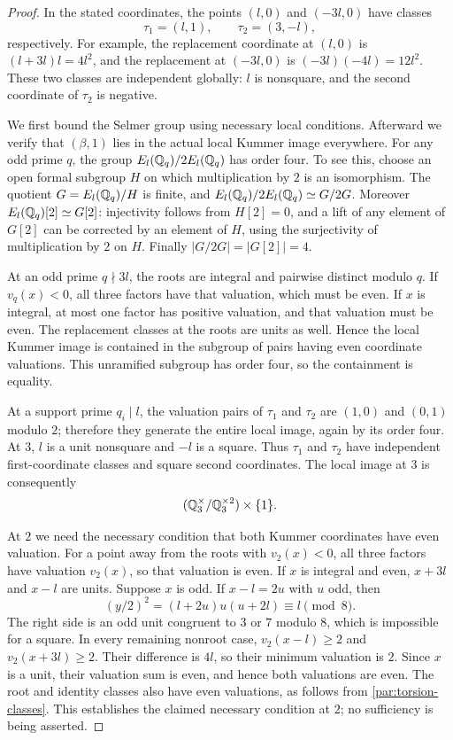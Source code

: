 \begin{proof}
In the stated coordinates, the points $(l,0)$ and $(-3l,0)$ have
classes
\begin{equation}\label{par:torsion-classes}
 \tau_1=(l,1),\qquad \tau_2=(3,-l),
\end{equation}
respectively. For example, the replacement coordinate at $(l,0)$
is $(l+3l)l=4l^2$, and the replacement at $(-3l,0)$ is
$(-3l)(-4l)=12l^2$. These two classes are independent globally:
$l$ is nonsquare, and the second coordinate of $\tau_2$ is negative.

We first bound the Selmer group using necessary local conditions.
Afterward we verify that $(\beta,1)$ lies in the actual local Kummer
image everywhere. For any odd prime $q$, the group
$E_l(\mathbb Q_q)/2E_l(\mathbb Q_q)$ has order four. To see this, choose an
open formal subgroup $H$ on which multiplication by $2$ is an
isomorphism. The quotient $G=E_l(\mathbb Q_q)/H$ is finite, and
$E_l(\mathbb Q_q)/2E_l(\mathbb Q_q)\simeq G/2G$. Moreover
$E_l(\mathbb Q_q)[2]\simeq G[2]$: injectivity follows from $H[2]=0$,
and a lift of any element of $G[2]$ can be corrected by an element
of $H$, using the surjectivity of multiplication by $2$ on $H$.
Finally $|G/2G|=|G[2]|=4$.

At an odd prime $q\nmid3l$, the roots are integral and pairwise
distinct modulo $q$. If $v_q(x)<0$, all three factors have that
valuation, which must be even. If $x$ is integral, at most one
factor has positive valuation, and that valuation must be even.
The replacement classes at the roots are units as well. Hence
the local Kummer image is contained in the subgroup of pairs
having even coordinate valuations. This unramified subgroup has
order four, so the containment is equality.

At a support prime $q_i\mid l$, the valuation pairs of $\tau_1$
and $\tau_2$ are $(1,0)$ and $(0,1)$ modulo $2$; therefore they
generate the entire local image, again by its order four. At $3$,
$l$ is a unit nonsquare and $-l$ is a square. Thus $\tau_1$
and $\tau_2$ have independent first-coordinate classes and square
second coordinates. The local image at $3$ is consequently
\begin{equation}\label{par:local-three}
 (\mathbb Q_3^\times/\mathbb Q_3^{\times2})\times\{1\}.
\end{equation}

At $2$ we need the necessary condition that both Kummer coordinates
have even valuation. For a point away from the roots with
$v_2(x)<0$, all three factors have valuation $v_2(x)$, so that
valuation is even. If $x$ is integral and even, $x+3l$ and $x-l$
are units. Suppose $x$ is odd. If $x-l=2u$ with $u$ odd, then
\[
 (y/2)^2=(l+2u)u(u+2l)\equiv l\pmod8.
\]
The right side is an odd unit congruent to $3$ or $7$ modulo $8$,
which is impossible for a square. In every remaining nonroot
case, $v_2(x-l)\ge2$ and $v_2(x+3l)\ge2$. Their difference is
$4l$, so their minimum valuation is $2$. Since $x$ is a unit,
their valuation sum is even, and hence both valuations are even.
The root and identity classes also have even valuations, as follows
from \eqref{par:torsion-classes}. This establishes the claimed
necessary condition at $2$; no sufficiency is being asserted.


\end{proof}
